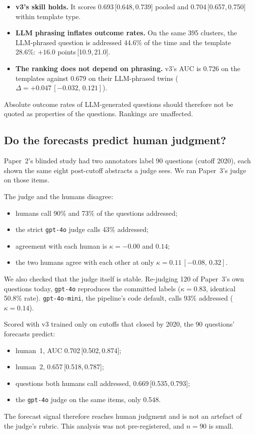\documentclass[11pt]{article}
\newcommand{\ci}[2]{\,[#1,\,#2]}
\begin{document}
\begin{itemize}
\item \textbf{v3's skill holds.} It scores 0.693\ci{0.648}{0.739} pooled and
  0.704\ci{0.657}{0.750} within template type.
\item \textbf{LLM phrasing inflates outcome rates.} On the same 395 clusters,
  the LLM-phrased question is addressed 44.6\% of the time and the template
  28.6\%: $+16.0$ points\ci{10.9}{21.0}.
\item \textbf{The ranking does not depend on phrasing.} v3's AUC is 0.726 on
  the templates against 0.679 on their LLM-phrased twins
  ($\Delta=+0.047\ci{-0.032}{0.121}$).
\end{itemize}
Absolute outcome rates of LLM-generated questions should therefore not be
quoted as properties of the questions. Rankings are unaffected.

\subsection{Do the forecasts predict human judgment?}\label{sec:judge}
Paper~2's blinded study had two annotators label 90 questions (cutoff 2020),
each shown the same eight post-cutoff abstracts a judge sees. We ran Paper~3's
judge on those items.

The judge and the humans disagree:
\begin{itemize}
\item humans call 90\% and 73\% of the questions addressed;
\item the strict \texttt{gpt-4o} judge calls 43\% addressed;
\item agreement with each human is $\kappa=-0.00$ and $0.14$;
\item the two humans agree with each other at only
  $\kappa=0.11\ci{-0.08}{0.32}$.
\end{itemize}

We also checked that the judge itself is stable. Re-judging 120 of Paper~3's
own questions today, \texttt{gpt-4o} reproduces the committed labels
($\kappa=0.83$, identical 50.8\% rate). \texttt{gpt-4o-mini}, the pipeline's
code default, calls 93\% addressed ($\kappa=0.14$).

Scored with v3 trained only on cutoffs that closed by 2020, the 90 questions'
forecasts predict:
\begin{itemize}
\item human~1, AUC 0.702\ci{0.502}{0.874};
\item human~2, 0.657\ci{0.518}{0.787};
\item questions both humans call addressed, 0.669\ci{0.535}{0.793};
\item the \texttt{gpt-4o} judge on the same items, only 0.548.
\end{itemize}
The forecast signal therefore reaches human judgment and is not an artefact of
the judge's rubric. This analysis was not pre-registered, and $n=90$ is small.
\end{document}
